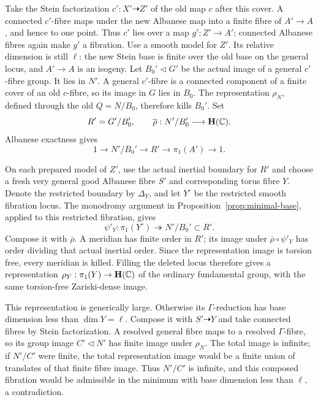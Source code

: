 Take the Stein factorization \(c':X'\dashrightarrow Z'\) of the
old map \(c\) after this cover. A connected \(c'\)-fibre maps under
the new Albanese map into a finite fibre of \(A'\to A\), and hence
to one point. Thus \(c'\) lies over a map \(g':Z'\to A'\);
connected Albanese fibres again make \(g'\) a fibration.
Use a smooth model for \(Z'\). Its relative dimension is still \(\ell\):
the new Stein base is finite over the old base on the general locus,
and \(A'\to A\) is an isogeny. Let \(B_0'\triangleleft G'\) be the
actual image of a general \(c'\)-fibre group. It lies in \(N'\).
A general \(c'\)-fibre is a connected component of a finite cover
of an old \(c\)-fibre, so its image in \(G\) lies in \(B_0\).
The representation \(\rho_N\), defined through the old \(Q=N/B_0\),
therefore kills \(B_0'\). Set
\[
 R'=G'/B_0',\qquad
 \overline\rho:N'/B_0'\longrightarrow\mathbf H(\mathbb C).
\]
Albanese exactness gives
\[
 1\longrightarrow N'/B_0'\longrightarrow R'
 \longrightarrow\pi_1(A')\longrightarrow1.
\]

On each prepared model of \(Z'\), use the actual inertial boundary
for \(R'\) and choose a fresh very general good Albanese fibre \(S'\)
and corresponding torus fibre \(Y\). Denote the restricted boundary
by \(\Delta_Y\), and let \(Y^\circ\) be the restricted smooth
fibration locus. The monodromy argument in
Proposition~\ref{prop:minimal-base}, applied to this restricted
fibration, gives
\[
 \psi'_Y:\pi_1(Y^\circ)\twoheadrightarrow N'/B_0'\subset R'.
\]
Compose it with \(\overline\rho\). A meridian has finite order in
\(R'\); its image under \(\overline\rho\circ\psi'_Y\) has order
dividing that actual inertial order. Since the representation image
is torsion free, every meridian is killed. Filling the deleted locus
therefore gives a representation
\(\rho_Y:\pi_1(Y)\to\mathbf H(\mathbb C)\) of the ordinary fundamental
group, with the same torsion-free Zariski-dense image.

This representation is generically large. Otherwise its
\(\Gamma\)-reduction has base dimension less than
\(\dim Y=\ell\). Compose it with \(S'\dashrightarrow Y\) and take
connected fibres by Stein factorization. A resolved general fibre
maps to a resolved \(\Gamma\)-fibre, so its group image
\(C'\triangleleft N'\) has finite image under \(\rho_N\).
The total image is infinite; if \(N'/C'\) were finite, the total
representation image would be a finite union of translates of that
finite fibre image.
Thus \(N'/C'\) is infinite, and this composed fibration would be
admissible in the minimum with base dimension less than \(\ell\),
a contradiction.

